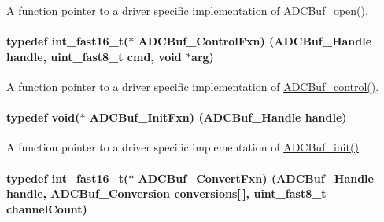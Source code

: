 A function pointer to a driver specific implementation of \hyperlink{_a_d_c_buf_8h_a0b63bca2e8f8e5b58f0c657ac662c97b}{A\+D\+C\+Buf\+\_\+open()}. 

\paragraph[{A\+D\+C\+Buf\+\_\+\+Control\+Fxn}]{\setlength{\rightskip}{0pt plus 5cm}typedef int\+\_\+fast16\+\_\+t($\ast$ A\+D\+C\+Buf\+\_\+\+Control\+Fxn) ({\bf A\+D\+C\+Buf\+\_\+\+Handle} handle, uint\+\_\+fast8\+\_\+t cmd, void $\ast$arg)}\label{_a_d_c_buf_8h_a24f4127b82e138fa18c8a54b4d914e05}


A function pointer to a driver specific implementation of \hyperlink{_a_d_c_buf_8h_a9b9765fb0ac57dee9df234a79dcd5aea}{A\+D\+C\+Buf\+\_\+control()}. 

\paragraph[{A\+D\+C\+Buf\+\_\+\+Init\+Fxn}]{\setlength{\rightskip}{0pt plus 5cm}typedef void($\ast$ A\+D\+C\+Buf\+\_\+\+Init\+Fxn) ({\bf A\+D\+C\+Buf\+\_\+\+Handle} handle)}\label{_a_d_c_buf_8h_ab63b9bc37ab6f5fa2521c18b38c1881e}


A function pointer to a driver specific implementation of \hyperlink{_a_d_c_buf_8h_a88a0ab421304465b22417a7adef6c0c2}{A\+D\+C\+Buf\+\_\+init()}. 

\paragraph[{A\+D\+C\+Buf\+\_\+\+Convert\+Fxn}]{\setlength{\rightskip}{0pt plus 5cm}typedef int\+\_\+fast16\+\_\+t($\ast$ A\+D\+C\+Buf\+\_\+\+Convert\+Fxn) ({\bf A\+D\+C\+Buf\+\_\+\+Handle} handle, {\bf A\+D\+C\+Buf\+\_\+\+Conversion} conversions\mbox{[}$\,$\mbox{]}, uint\+\_\+fast8\+\_\+t channel\+Count)}\label{_a_d_c_buf_8h_a57f40a75d77241e2fda473f0538e404d}



